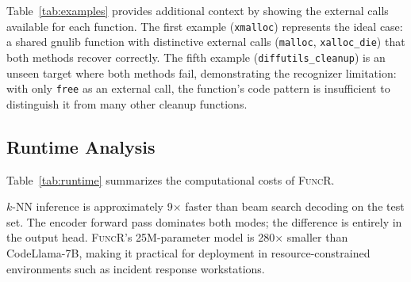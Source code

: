 \documentclass[sigconf,nonacm]{acmart}
\newcommand{\sysname}{\textsc{FuncR}}
\begin{document}
Table~\ref{tab:examples} provides additional context by showing the external calls available for each function. The first example (\texttt{xmalloc}) represents the ideal case: a shared gnulib function with distinctive external calls (\texttt{malloc}, \texttt{xalloc\_die}) that both methods recover correctly. The fifth example (\texttt{diffutils\_cleanup}) is an unseen target where both methods fail, demonstrating the recognizer limitation: with only \texttt{free} as an external call, the function's code pattern is insufficient to distinguish it from many other cleanup functions.

\subsection{Runtime Analysis}

Table~\ref{tab:runtime} summarizes the computational costs of \sysname{}.

\begin{table}[t]
    \centering
    \caption{Runtime analysis on NVIDIA A100 (40GB).}
    \label{tab:runtime}
\end{table}

$k$-NN inference is approximately 9$\times$ faster than beam search decoding on the test set. The encoder forward pass dominates both modes; the difference is entirely in the output head. \sysname{}'s 25M-parameter model is 280$\times$ smaller than CodeLlama-7B, making it practical for deployment in resource-constrained environments such as incident response workstations.
\end{document}
